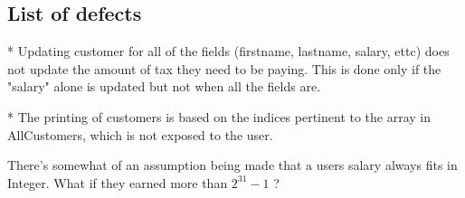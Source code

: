 \subsection{List of defects}



* Updating customer for all of the fields (firstname, lastname, salary, ettc) does not update the amount of tax they need to be paying. This is done only if the "salary" alone is updated but not when all the fields are. 

* The printing of customers is based on the indices pertinent to the array in AllCustomers, which is not exposed to the user. 

There's somewhat of an assumption being made that a users salary always fits in Integer. What if they earned more than $2^31 - 1$ ? 




